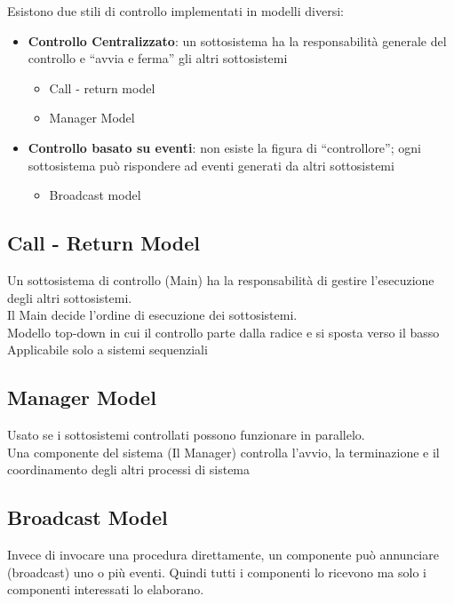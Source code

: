 Esistono due stili di controllo implementati in modelli diversi:
\begin{itemize}
    \item \textbf{Controllo Centralizzato}: un sottosistema ha la responsabilità generale del controllo e “avvia e ferma” gli altri sottosistemi
    \begin{itemize}
        \item Call - return model
        \item Manager Model
    \end{itemize}
    
    \item \textbf{Controllo basato su eventi}: non esiste la figura di “controllore”; ogni sottosistema può rispondere ad eventi generati da altri sottosistemi
    \begin{itemize}
        \item Broadcast model
    \end{itemize}
\end{itemize}

\subsection{Call - Return Model}
Un sottosistema di controllo (Main) ha la responsabilità di gestire l’esecuzione degli altri sottosistemi.\\
Il Main decide l’ordine di esecuzione dei sottosistemi.\\
Modello top-down in cui il controllo parte dalla radice e si sposta verso il basso\\
Applicabile solo a sistemi sequenziali

\subsection{Manager Model}
Usato se i sottosistemi controllati possono funzionare in parallelo.\\
Una componente del sistema (Il Manager) controlla l’avvio, la terminazione e il coordinamento degli altri processi di sistema

\subsection{Broadcast Model}
Invece di invocare una procedura direttamente, un componente può annunciare (broadcast) uno o più eventi. Quindi tutti i componenti lo ricevono ma solo i componenti interessati lo elaborano.

